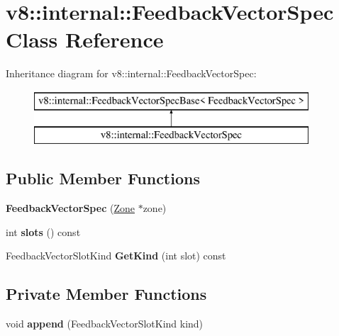 \hypertarget{classv8_1_1internal_1_1_feedback_vector_spec}{}\section{v8\+:\+:internal\+:\+:Feedback\+Vector\+Spec Class Reference}
\label{classv8_1_1internal_1_1_feedback_vector_spec}
Inheritance diagram for v8\+:\+:internal\+:\+:Feedback\+Vector\+Spec\+:\begin{figure}[H]
\begin{center}
\leavevmode
\includegraphics[height=2.000000cm]{classv8_1_1internal_1_1_feedback_vector_spec}
\end{center}
\end{figure}
\subsection*{Public Member Functions}
\begin{DoxyCompactItemize}
\item 
{\bfseries Feedback\+Vector\+Spec} (\hyperlink{classv8_1_1internal_1_1_zone}{Zone} $\ast$zone)\hypertarget{classv8_1_1internal_1_1_feedback_vector_spec_a05e57486e269d6a6195ff019f0885e2d}{}\label{classv8_1_1internal_1_1_feedback_vector_spec_a05e57486e269d6a6195ff019f0885e2d}

\item 
int {\bfseries slots} () const \hypertarget{classv8_1_1internal_1_1_feedback_vector_spec_adbc748a50a2dc5f4a8ebe7e3f41b3b5d}{}\label{classv8_1_1internal_1_1_feedback_vector_spec_adbc748a50a2dc5f4a8ebe7e3f41b3b5d}

\item 
Feedback\+Vector\+Slot\+Kind {\bfseries Get\+Kind} (int slot) const \hypertarget{classv8_1_1internal_1_1_feedback_vector_spec_adc5c1f97cf2bf826b04e84bd156b0142}{}\label{classv8_1_1internal_1_1_feedback_vector_spec_adc5c1f97cf2bf826b04e84bd156b0142}

\end{DoxyCompactItemize}
\subsection*{Private Member Functions}
\begin{DoxyCompactItemize}
\item 
void {\bfseries append} (Feedback\+Vector\+Slot\+Kind kind)\hypertarget{classv8_1_1internal_1_1_feedback_vector_spec_a91e7ccecee1e0f6f6bf193b835abe518}{}\label{classv8_1_1internal_1_1_feedback_vector_spec_a91e7ccecee1e0f6f6bf193b835abe518}

\end{DoxyCompactItemize}
